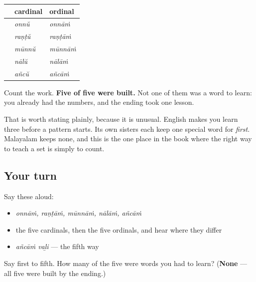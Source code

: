 \begin{grammarlens}[title={What you've built}]
\noindent
\begin{tabularx}{\linewidth}{@{}>{\raggedright\arraybackslash}X>{\raggedright\arraybackslash}X>{\raggedright\arraybackslash}X@{}}
\toprule
\textbf{} & \textbf{cardinal} & \textbf{ordinal} \\
\midrule
1 & \ml{ഒന്ന്} \emph{onnŭ} & \textbf{\ml{ഒന്നാം}} \emph{onnāṁ} \\
2 & \ml{രണ്ട്} \emph{raṇṭŭ} & \textbf{\ml{രണ്ടാം}} \emph{raṇṭāṁ} \\
3 & \ml{മൂന്ന്} \emph{mūnnŭ} & \textbf{\ml{മൂന്നാം}} \emph{mūnnāṁ} \\
4 & \ml{നാല്} \emph{nālŭ} & \textbf{\ml{നാലാം}} \emph{nālāṁ} \\
5 & \ml{അഞ്ച്} \emph{añcŭ} & \textbf{\ml{അഞ്ചാം}} \emph{añcāṁ} \\
\bottomrule
\end{tabularx}

Count the work. \textbf{Five of five were built.} Not one of them was a word to learn: you already had the numbers, and the ending took one lesson.

That is worth stating plainly, because it is unusual. English makes you learn three before a pattern starts. Its own sisters each keep one special word for \emph{first}. Malayalam keeps none, and this is the one place in the book where the right way to teach a set is simply to count.
\end{grammarlens}

\subsection*{Your turn}
Say these aloud:

\begin{itemize}
\raggedright
  \item \emph{onnāṁ, raṇṭāṁ, mūnnāṁ, nālāṁ, añcāṁ}
  \item the five cardinals, then the five ordinals, and hear where they differ
  \item \emph{añcāṁ vaḻi} — the fifth way
\end{itemize}

\begin{tcolorbox}[breakable,colback=teal!4,colframe=teal!35!black,title={Before you move on}]
Say first to fifth. How many of the five were words you had to learn? (\textbf{None} — all five were built by the ending.)
\end{tcolorbox}
